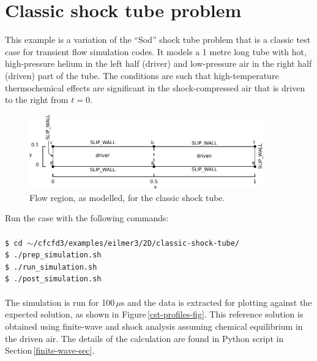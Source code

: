 
\section{Classic shock tube problem}
%
This example is a variation of the ``Sod'' shock tube problem that is a classic
test case for transient flow simulation codes.
It models a 1 metre long tube with hot, high-pressure helium in the left half (driver) and
low-pressure air in the right half (driven) part of the tube.
The conditions are such that high-temperature thermochemical effects are significant
in the shock-compressed air that is driven to the right from $t=0$.

\begin{figure}[htbp]
\begin{center}
\includegraphics[width=0.9\textwidth]{../2D/classic-shock-tube/cst-edited.pdf}
\end{center}
\caption{Flow region, as modelled, for the classic shock tube.}
\label{cst-model-fig}
\end{figure}

Run the case with the following commands:\\
%
\topbar\\
\texttt{\$ cd $\sim$/cfcfd3/examples/eilmer3/2D/classic-shock-tube/}\\
\texttt{\$ ./prep\_simulation.sh}\\
\texttt{\$ ./run\_simulation.sh}\\
\texttt{\$ ./post\_simulation.sh}\\
\bottombar\\
%

The simulation is run for 100\,$\mu$s and the data is extracted for plotting against
the expected solution, as shown in Figure\,\ref{cst-profiles-fig}.
This reference solution is obtained using finite-wave and shock analysis assuming chemical equilibrium 
in the driven air.
The details of the calculation are found in Python script in Section\,\ref{finite-wave-sec}.

